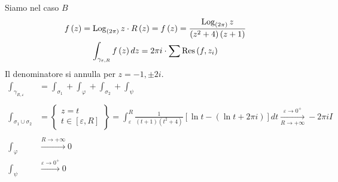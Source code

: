 Siamo nel caso $B$
\begin{gather*}
f\left(z\right) = \operatorname{Log}_{\left(2\pi \right)} z\cdot R\left(z\right) = f\left(z\right) = \frac{\operatorname{Log}_{\left(2\pi \right)} z}{\left(z^{2} + 4\right)\left(z + 1\right)}\\
\int _{\gamma _{\varepsilon ,R}} f\left(z\right) dz = 2\pi i\cdot \sum \operatorname{Res} \left(f,z_{i}\right)
\end{gather*}
Il denominatore si annulla per $z = -1,\pm 2i$.
\begin{equation*}
\begin{aligned}
\int _{\gamma _{R,\varepsilon }} & = \int _{\sigma _{1}} + \int _{\varphi } + \int _{\sigma _{2}} + \int _{\psi }\\
 & \\
\int _{\sigma _{1} \cup \sigma _{2}} & = \left\{
\begin{array}{ c }
z = t\\
t\in \left[ \varepsilon ,R\right]
\end{array}\right\} = \int ^{R}_{\varepsilon }\frac{1}{\left(t + 1\right)\left(t^{2} + 4\right)}\left[\ln t - \left(\ln t + 2\pi i\right)\right] dt\xrightarrow[R\rightarrow + \infty ]{\varepsilon \rightarrow 0^{ + }} - 2\pi iI\\
 & \\
\int _{\varphi } & \xrightarrow{R\rightarrow + \infty } 0\\
\int _{\psi } & \xrightarrow{\varepsilon \rightarrow 0^{ + }} 0
\end{aligned}
\end{equation*}
\Soluzione

